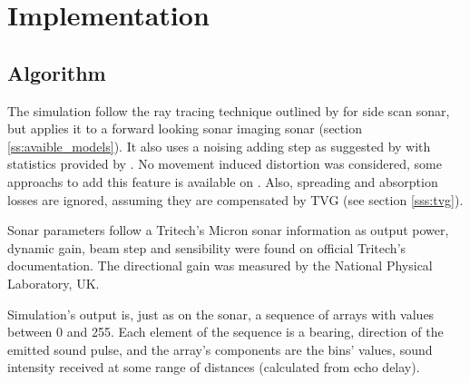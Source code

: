 
\section{Implementation}

\subsection{Algorithm}
\label{ss:algorithm}

The simulation follow the ray tracing technique outlined by
\citet{bell1997simulation} for side scan sonar, but applies it to a forward
looking sonar imaging sonar (section \ref{ss:avaible_models}). It also uses a
noising adding step as suggested by \citet{coiras2009gpu} with statistics
provided by \citet{maussang2007mean}.
No movement induced distortion was considered, some approachs to add this
feature is available on \citet{bell1999techniques,borawski2005sonar}. Also,
spreading and absorption losses are ignored, assuming they are compensated by
TVG (see section \ref{sss:tvg}).

Sonar parameters follow a Tritech's Micron sonar\cite{micronsonar}
information as output power, dynamic gain, beam step and sensibility were found
on official Tritech's documentation\cite{micronsonar,micronmodem}. The directional
gain was measured by the National Physical Laboratory, UK.

Simulation's output is, just as on the sonar, a sequence of arrays with values
between 0 and 255. Each element of the sequence is a bearing, direction of the
emitted sound pulse, and the array's components are the bins' values, sound
intensity received at some range of distances (calculated from echo delay).

